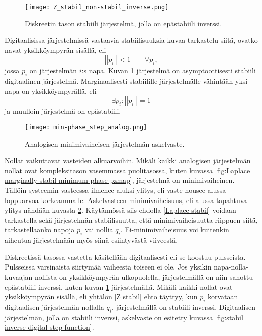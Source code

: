 \documentclass[finnish,12pt]{article}
\begin{document}
\begin{figure}[h!]
\centering
\texttt{[image: Z\_stabil\_non-stabil\_inverse.png]}
\caption{Diskreetin tason stabiili järjestelmä, jolla on epästabiili inverssi.}
\label{fig:Z stabil non-stabil inverse}
\end{figure}

Digitaalisissa järjestelmissä vastaavia stabiilisuuksia kuvaa tarkastelu siitä, ovatko navat yksikköympyrän sisällä, eli \begin{equation}
\left|\left|p_i\right|\right| < 1 \qquad \forall p_i,
\label{Z stabil}
\end{equation} jossa $p_i$ on järjestelmän $i$:s napa. Kuvan \ref{fig:Z stabil non-stabil inverse} järjestelmä on asymptoottisesti stabiili digitaalinen järjestelmä. Marginaalisesti stabiilille järjestelmälle vähintään yksi napa on yksikköympyrällä, eli \begin{equation}
\exists p_i : \left|\left|p_i\right|\right| = 1
\label{Z marginal stabil}
\end{equation} ja muulloin järjestelmä on epästabiili. \cite{Hall2010}

\begin{figure}[h!]
\centering
\texttt{[image: min-phase\_step\_analog.png]}
\caption{Analogisen minimivaiheisen järjestelmän askelvaste.}
\label{fig:min-phase analog step function}
\end{figure}

Nollat vaikuttavat vasteiden alkuarvoihin. Mikäli kaikki analogisen järjestelmän nollat ovat kompleksitason vasemmassa puolitasossa, kuten kuvassa \ref{fig:Laplace marginally stabil minimum phase pzmap}, järjestelmä on minimivaiheinen. Tällöin systeemin vasteessa ilmenee aluksi ylitys, eli vaste nousee alussa loppuarvoa korkeammalle. Askelvasteen minimivaiheisuus, eli alussa tapahtuva ylitys nähdään kuvasta \ref{fig:min-phase analog step function}. Käytännössä siis ehdolla \eqref{Laplace stabil} voidaan tarkastella sekä järjestelmän stabiilisuutta, että minimivaiheisuutta riippuen siitä, tarkastellaanko napoja $p_i$ vai nollia $q_i$. Ei-minimivaiheisuus voi kuitenkin aiheutua järjestelmään myös siinä esiintyvästä viiveestä.

Diskreetissä tasossa vastetta käsitellään digitaalisesti eli se koostuu pulsseista. Pulsseissa varsinaista siirtymää vaiheesta toiseen ei ole. Jos yksikin napa-nolla-kuvaajan nollista on yksikköympyrän ulkopuolella, järjestelmällä on niin sanottu epästabiili inverssi, kuten kuvan \ref{fig:Z stabil non-stabil inverse} järjestelmällä. Mikäli kaikki nollat ovat yksikköympyrän sisällä, eli yhtälön \eqref{Z stabil} ehto täyttyy, kun $p_i$ korvataan digitaalisen järjestelmän nollalla $q_i$, järjestelmällä on stabiili inverssi. Digitaalisen järjestelmän, jolla on stabiili inverssi, askelvaste on esitetty kuvassa \ref{fig:stabil inverse digital step function}.
\end{document}
